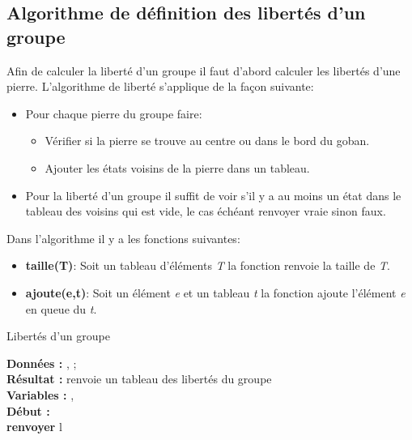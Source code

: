     \subsection{Algorithme de définition des libertés d'un groupe}
    Afin de calculer la liberté d'un groupe il faut d'abord calculer les libertés d'une pierre.
    L'algorithme de liberté s'applique de la façon suivante:
    \begin{itemize}
        \item Pour chaque pierre du groupe faire:
        \begin{itemize}
            \item Vérifier si la pierre se trouve au centre ou dans le bord du goban.
            \item Ajouter les états voisins de la pierre dans un tableau.
        \end{itemize}
        \item Pour la liberté d'un groupe il suffit de voir s'il y a au moins un état dans le tableau des voisins qui est vide, le cas échéant renvoyer vraie sinon faux.\\
    \end{itemize}
    
    \begin{framed}
    Dans l'algorithme il y a les fonctions suivantes:
    \begin{itemize}
    \item \textbf{taille(T)}: Soit un tableau d'éléments \textit{T} la fonction renvoie la taille de \textit{T}.
    \item \textbf{ajoute(e,t)}: Soit un élément \textit{e} et un tableau \textit{t} la fonction ajoute l'élément \textit{e} en queue du \textit{t}.
    \end{itemize}
    \end{framed}
    
    \begin{algorithme}
    \caption{Libertés d'un groupe}
    \textbf{Données :}  
    ,
    ;\\
    \textbf{Résultat :} renvoie un tableau des libertés du groupe \\
    \textbf{Variables :}
    ,\\
    \textbf{Début :}\\
    {
    {}}
    \textbf{renvoyer} l
    \end{algorithme}
